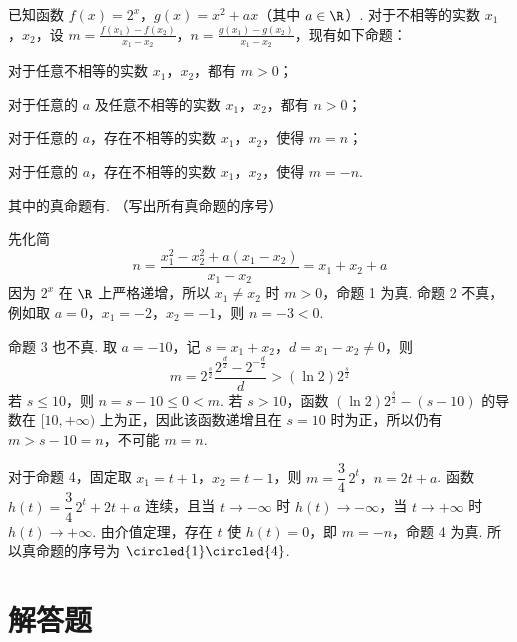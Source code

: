 \begin{problem}
已知函数 \(f(x) = 2^x\)，\(g(x) = x^2 + ax\)（其中 \(a \in \R\)）. 对于不相等的实数 \(x_1\)，\(x_2\)，设 \(m = \frac{f(x_1) - f(x_2)}{x_1 - x_2}\)，\(n = \frac{g(x_1) - g(x_2)}{x_1 - x_2}\)，现有如下命题：
\begin{circlelist}
\item 对于任意不相等的实数 \(x_{1}\)，\(x_{2}\)，都有 \(m > 0\)；
\item 对于任意的 \(a\) 及任意不相等的实数 \(x_{1}\)，\(x_{2}\)，都有 \(n > 0\)；
\item 对于任意的 \(a\)，存在不相等的实数 \(x_{1}\)，\(x_{2}\)，使得 \(m = n\)；
\item 对于任意的 \(a\)，存在不相等的实数 \(x_{1}\)，\(x_{2}\)，使得 \(m = -n\).
\end{circlelist}
其中的真命题有\fillinblank{}. （写出所有真命题的序号）


\begin{solution}
先化简
\[
n=\frac{x_1^2-x_2^2+a(x_1-x_2)}{x_1-x_2}=x_1+x_2+a
\]
因为 \(2^x\) 在 \(\R\) 上严格递增，所以 \(x_1\ne x_2\) 时 \(m>0\)，命题 1 为真. 命题 2 不真，例如取 \(a=0\)，\(x_1=-2\)，\(x_2=-1\)，则 \(n=-3<0\).

命题 3 也不真. 取 \(a=-10\)，记 \(s=x_1+x_2\)，\(d=x_1-x_2\ne0\)，则
\[
m=2^{\frac{s}{2}}\frac{2^{\frac{d}{2}}-2^{-\frac{d}{2}}}{d}>(\ln2)2^{\frac{s}{2}}
\]
若 \(s\leqslant10\)，则 \(n=s-10\leqslant0<m\). 若 \(s>10\)，函数 \((\ln2)2^{\frac{s}{2}}-(s-10)\) 的导数在 \([10,+\infty)\) 上为正，因此该函数递增且在 \(s=10\) 时为正，所以仍有 \(m>s-10=n\)，不可能 \(m=n\).

对于命题 4，固定取 \(x_1=t+1\)，\(x_2=t-1\)，则
\(m=\dfrac34\,2^t\)，\(n=2t+a\). 函数
\(h(t)=\dfrac34\,2^t+2t+a\) 连续，且当 \(t\to-\infty\) 时 \(h(t)\to-\infty\)，当 \(t\to+\infty\) 时 \(h(t)\to+\infty\). 由介值定理，存在 \(t\) 使 \(h(t)=0\)，即 \(m=-n\)，命题 4 为真. 所以真命题的序号为 \(\circled{1}\circled{4}\).
\end{solution}
\end{problem}

\section{解答题}

